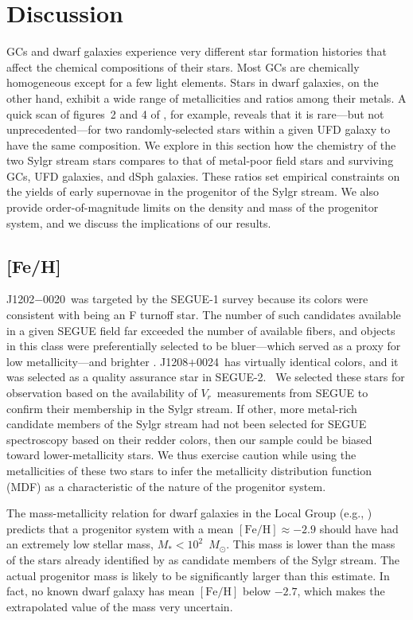 \documentclass[twocolumn,tighten]{aastex62}
\newcommand{\feh}{{\mathrm{[Fe/H]}}}
\newcommand{\jtwo}{J1202$-$0020}
\newcommand{\jeight}{J1208$+$0024}
\newcommand{\msun}{\mbox{$M_{\odot}$}}
\newcommand{\rv}{$V_{r}$}
\begin{document}
\section{Discussion}
\label{discussion}


GCs and dwarf galaxies experience very different star formation histories
that affect the chemical compositions of their stars.
Most GCs are chemically homogeneous except for a few light elements.
Stars in dwarf galaxies, on the other hand, exhibit a wide range
of metallicities and ratios among their metals.
A quick scan of figures~2 and 4 of 
\citet{ji19gru1tri2}, for example, reveals that
it is rare---but not unprecedented---for 
two randomly-selected stars
within a given UFD galaxy to have the same composition.
We explore in this section
how the chemistry of the two Sylgr stream stars compares to
that of metal-poor field stars and
surviving GCs, UFD galaxies, and dSph galaxies.
These ratios set empirical constraints
on the yields of early supernovae 
in the progenitor of the Sylgr stream.
We also provide order-of-magnitude limits
on the density and mass of the progenitor system,
and we discuss the implications of our results.


\subsection{[Fe/H]}
\label{cluesmetallicity}


\jtwo\ was targeted
by the SEGUE-1 survey because its colors were
consistent with being an F turnoff star.
The number of such candidates available in a given SEGUE field
far exceeded the number of available fibers, 
and objects in this class were preferentially selected to be
bluer---which served as a proxy for low metallicity---and brighter
\citep{yanny09}.
\jeight\ has virtually identical colors, and it was selected
as a quality assurance star in SEGUE-2.~
We selected these stars for observation based on 
the availability of \rv\ measurements from SEGUE
to confirm their membership in the Sylgr stream.
If other, more metal-rich candidate members of the Sylgr stream had not 
been selected for SEGUE spectroscopy based on their 
redder colors, then our sample
could be biased toward lower-metallicity stars.
We thus exercise caution while using 
the metallicities of these two stars
to infer the metallicity distribution function (MDF)
as a characteristic of the nature of the progenitor system.

The mass-metallicity relation for dwarf galaxies in the Local Group
(e.g., \citealt{kirby13massmetal})
predicts that a progenitor system with a mean 
$\feh\approx -2.9$ should have had
an extremely low stellar mass, $M_{*} < 10^2$~\msun.
This mass is lower than the mass of the stars
already identified by  
as candidate members of the Sylgr stream. 
The actual progenitor mass is likely to be significantly larger
than this estimate. 
In fact, no known dwarf galaxy has mean $\feh$ below $-2.7$, 
which makes the extrapolated value of the mass very uncertain.
\end{document}
